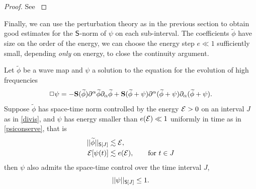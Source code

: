 \begin{proof}
	See \cite[Section 10.2]{SterbenzTataru2010}
\end{proof}

Finally, we can use the perturbation theory as in the previous section to obtain good estimates for the $\mathsf S$-norm of $\psi$ on each sub-interval. The coefficients $\widetilde \phi$ have size on the order of the energy, we can choose the energy step $e \ll 1$ sufficiently small, depending \textit{only} on energy, to close the continuity argument. 

\begin{lemma}
	Let $\widetilde \phi$ be a wave map and $\psi$ a solution to the equation for the evolution of high frequencies
	\begin{equation}
		\Box \psi
			= - {\bf S} (\widetilde \phi) \partial^\alpha \widetilde \phi \partial_\alpha \widetilde \phi + {\bf S} (\widetilde \phi + \psi) \partial^\alpha( \widetilde \phi + \psi) \partial_\alpha (\widetilde \phi + \psi).
			 \label{eq:highwave}
	\end{equation}
	Suppose $\widetilde\phi$ has space-time norm controlled by the energy $\mathcal E > 0$ on an interval $J$ as in \eqref{divis}, and $\psi$ has energy smaller than $e(\mathcal E) \ll 1$ uniformly in time as in \eqref{psiconserve}, that is 
		\begin{align}
			||\widetilde \phi||_{\mathsf S[J]} 
				&\lesssim \mathcal E \label{eq:lowphicontrol},\\
			\mathcal E[\psi(t)] 
				&\lesssim e(\mathcal E), \qquad \text{for $t \in J$}\label{eq:psicontrol}
		\end{align}
	then $\psi$ also admits the space-time control over the time interval $J$, 
	\begin{equation}
		||\psi||_{\mathsf S[J]} \leq 1. \label{eq:pert}
	\end{equation}
\end{lemma}

